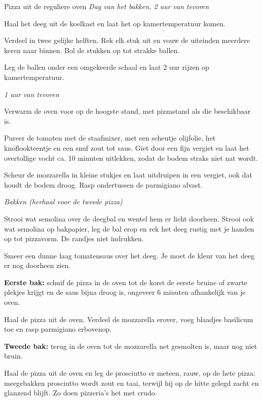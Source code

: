 \begin{recipe}{Pizza uit de reguliere oven}
\medskip
\noindent\textit{Dag van het bakken, 2 uur van tevoren}
\begin{steps}
  \item Haal het deeg uit de koelkast en laat het op kamertemperatuur komen.
  \item Verdeel in twee gelijke helften. Rek elk stuk uit en vouw de uiteinden
        meerdere keren naar binnen. Bol de stukken op tot strakke ballen.
  \item Leg de ballen onder een omgekeerde schaal en laat 2 uur rijzen op
        kamertemperatuur.
\end{steps}

\medskip
\noindent\textit{1 uur van tevoren}
\begin{steps}
  \item Verwarm de oven voor op de hoogste stand, met pizzastand als die
        beschikbaar is.
  \item Pureer de tomaten met de staafmixer, met een scheutje olijfolie, het knoflookteentje en
        een snuf zout tot saus. Giet door een fijn vergiet en laat het overtollige
        vocht ca. 10 minuten uitlekken, zodat de bodem straks niet nat wordt.
  \item Scheur de mozzarella in kleine stukjes en laat uitdruipen in een vergiet,
        ook dat houdt de bodem droog. Rasp ondertussen de parmigiano alvast.
\end{steps}

\medskip
\noindent\textit{Bakken (herhaal voor de tweede pizza)}
\begin{steps}
  \item Strooi wat semolina over de deegbal en wentel hem er licht doorheen.
        Strooi ook wat semolina op bakpapier, leg de bal erop en rek het deeg
        rustig met je handen op tot pizzavorm. De randjes niet indrukken.
  \item Smeer een dunne laag tomatensaus over het deeg. Je moet de kleur van
        het deeg er nog doorheen zien.
  \item \textbf{Eerste bak:} schuif de pizza in de oven tot de korst de eerste
        bruine of zwarte plekjes krijgt en de saus bijna droog is,
        ongeveer 6 minuten afhankelijk van je oven.
  \item Haal de pizza uit de oven. Verdeel de mozzarella erover, voeg
        blaadjes basilicum toe en rasp parmigiano erbovenop.
  \item \textbf{Tweede bak:} terug in de oven tot de mozzarella net gesmolten
        is, maar nog niet bruin.
  \item Haal de pizza uit de oven en leg de prosciutto er meteen, rauw, op de
        hete pizza: meegebakken prosciutto wordt zout en taai, terwijl hij op
        de hitte gelegd zacht en glanzend blijft. Zo doen pizzeria's het met
        crudo.
\end{steps}
\end{recipe}
